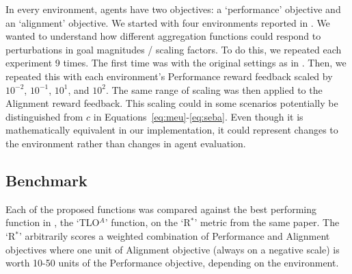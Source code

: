In every environment, agents have two objectives: a `performance' objective and an `alignment' objective. %
We started with four environments reported in \cite{vamplew_potential-based_2021}. We wanted to understand how different aggregation functions could respond to perturbations in goal magnitudes / scaling factors. To do this, we repeated each experiment 9 times. The first time was with the original settings as in \cite{vamplew_potential-based_2021}. Then, we repeated this with each environment's Performance reward feedback scaled by $10^{-2}$, $10^{-1}$, $10^1$, and $10^2$. The same range of scaling was then applied to the Alignment reward feedback. This scaling could in some scenarios potentially be distinguished from $c$ in Equations~\ref{eq:meu}-\ref{eq:seba}. Even though it is mathematically equivalent in our implementation, it could represent changes to the environment rather than changes in agent evaluation.

\subsection{Benchmark}

Each of the proposed functions was compared against the best performing function in \cite{vamplew_potential-based_2021}, the `TLO$^A$' function, on the `R$^*$' metric from the same paper. The `R$^*$' arbitrarily scores a weighted combination of Performance and Alignment objectives where one unit of Alignment objective (always on a negative scale) is worth 10-50 units of the Performance objective, depending on the environment.%


